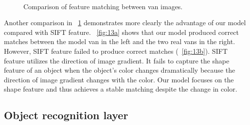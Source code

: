 \documentclass[9pt,twocolumn]{article}
\begin{document}
\begin{figure}
\centering
  \\
\caption{Comparison of feature matching between van images.}
\label{fig:13}
\end{figure}

Another comparison in \figurename~\ref{fig:13} demonstrates
more clearly the advantage of our model compared with SIFT feature.
\figurename~\ref{fig:13a} shows that our model produced correct matches
between the model van in the left and the two real vans in the right. 
However, SIFT feature failed to produce correct matches (\figurename~\ref{fig:13b}). 
SIFT feature utilizes the direction of image gradient. 
It fails to capture the shape feature of an object when
the object's color changes dramatically because the direction of
image gradient changes with the color. 
Our model focuses on the shape feature and thus achieves a stable matching despite
the change in color.


\subsection{Object recognition layer}
\end{document}
